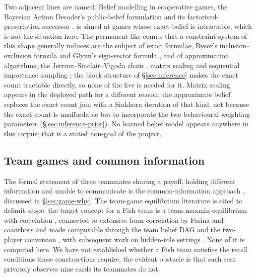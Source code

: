Two adjacent lines are named. Belief modelling in cooperative games, the Bayesian Action Decoder's
public-belief formulation \cite{foerster2019bad} and its factorised-prescription successor
\cite{sokota2021capi}, is aimed at games whose exact belief is intractable, which is not the
situation here. The permanent-like counts that a constraint system of this shape generally induces
are the subject of exact formulae, Ryser's inclusion--exclusion formula \cite{ryser} and Glynn's
sign-vector formula \cite{glynn}, and of approximation algorithms, the Jerrum--Sinclair--Vigoda
chain \cite{jsv}, matrix scaling \cite{lsw} and sequential importance sampling \cite{chen-sis}; the
block structure of \S\ref{sec:inference} makes the exact count tractable directly, so none of the
five is needed for it. Matrix scaling appears in the deployed path for a different reason: the
approximate belief replaces the exact count join with a Sinkhorn iteration of that kind, not because
the exact count is unaffordable but to incorporate the two behavioural weighting parameters
(\S\ref{sec:inference-prior}). No learned belief model appears anywhere in this corpus; that is a
stated non-goal of the project.

\subsection{Team games and common information}
\label{sec:related-team}

The formal statement of three teammates sharing a payoff, holding different information and unable
to communicate is the common-information approach \cite{nayyar2013common}, discussed in
\S\ref{sec:game-why}. The team-game equilibrium literature is cited to delimit scope: the target
concept for a Fish team is a team-maxmin equilibrium with correlation \cite{celli-gatti}, connected
to extensive-form correlation by Farina and coauthors \cite{farina-collusion} and made computable
through the team belief DAG and the two-player conversion \cite{zhang-tbdag,carminati-tpi}, with
subsequent work on hidden-role settings \cite{carminati2024hiddenrole}. None of it is computed here.
We have not established whether a Fish team satisfies the recall conditions those constructions
require; the evident obstacle is that each seat privately observes nine cards its teammates do not.


